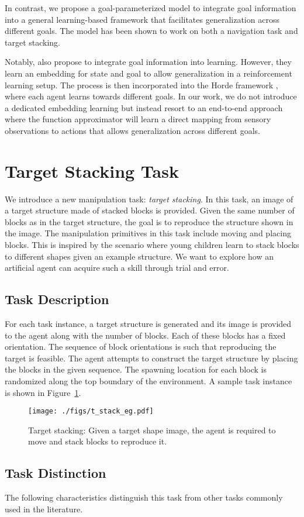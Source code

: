 \documentclass{article} %
\begin{document}
In contrast, we propose a goal-parameterized model to integrate goal information into a general learning-based framework that facilitates generalization across different goals. The model has been shown to work on both a navigation task and target stacking.

Notably, \cite{schaul2015universal} also propose to integrate goal information into learning. However, they learn an embedding for state and goal to allow generalization in a reinforcement learning setup. The process is then incorporated into the Horde framework \citet{sutton2011horde}, where each agent learns towards different goals. In our work, we do not introduce a dedicated embedding learning but instead resort to an end-to-end approach where the function approximator will learn a direct mapping from sensory observations to actions that allows generalization across different goals.

\section{Target Stacking Task}
We introduce a new manipulation task: {\em target stacking\/}. In this task, an image of a target structure made of stacked blocks is provided. Given the same number of blocks as in the target structure, the goal is to reproduce the structure shown in the image. The manipulation primitives in this task include moving and placing blocks. This is inspired by the scenario where young children learn to stack blocks to different shapes given an example structure. We want to explore how an artificial agent can acquire such a skill through trial and error. 

\subsection{Task Description}
For each task instance, a target structure is generated and its image is provided to the agent along with the number of blocks. Each of these blocks has a fixed orientation. The sequence of block orientations is such that reproducing the target is feasible. The agent attempts to construct the target structure by placing the blocks in the given sequence. The spawning location for each block is randomized along the top boundary of the environment. A sample task instance is shown in Figure~\ref{fig:tstack_demo}.

\begin{figure}
\centering
\texttt{[image: ./figs/t\_stack\_eg.pdf]}
\caption{Target stacking: Given a target shape image, the agent is required to move and stack blocks to reproduce it.}
\label{fig:tstack_demo}
\end{figure}\subsection{Task Distinction}
The following characteristics distinguish this task from other tasks commonly used in the literature.
\end{document}
